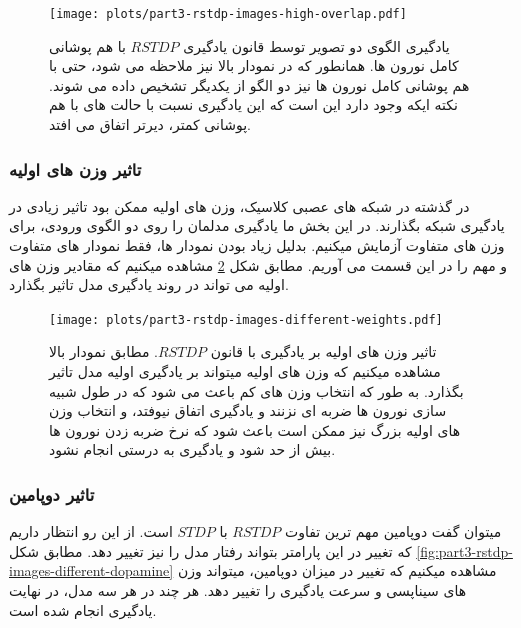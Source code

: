         \begin{figure}[!ht]
            \centering
            \captionsetup{width=.9\linewidth}
            \texttt{[image: plots/part3-rstdp-images-high-overlap.pdf]} 
            \caption{یادگیری الگوی دو تصویر توسط قانون یادگیری 
            $RSTDP$ با هم پوشانی کامل نورون ها.
            همانطور که در نمودار بالا نیز ملاحظه می شود، حتی با هم پوشانی کامل نورون ها نیز دو الگو از یکدیگر تشخیص داده می شوند. نکته ایکه وجود دارد این است که این یادگیری نسبت با حالت های با هم پوشانی کمتر، دیرتر اتفاق می افتد.
            }
            \label{fig:part3-rstdp-images-high-overlap}
        \end{figure}

        
        \clearpage
        \subsubsection*{تاثیر وزن های اولیه}
            در گذشته در شبکه های عصبی کلاسیک، وزن های اولیه ممکن بود تاثیر زیادی در یادگیری شبکه بگذارند. در این بخش ما یادگیری مدلمان را روی دو الگوی ورودی، برای وزن های متفاوت آزمایش میکنیم. بدلیل زیاد بودن نمودار ها، فقط نمودار های متفاوت و مهم را در این قسمت می آوریم.
            مطابق شکل 
            \ref{fig:part3-rstdp-images-different-weights}
            مشاهده میکنیم که مقادیر وزن های اولیه می تواند در روند یادگیری مدل تاثیر بگذارد.
            \begin{figure}[!ht]
                \centering
                \captionsetup{width=.9\linewidth}
                \texttt{[image: plots/part3-rstdp-images-different-weights.pdf]} 
                \caption{تاثیر وزن های اولیه بر یادگیری با قانون 
                $RSTDP$. 
                مطابق نمودار بالا مشاهده میکنیم که وزن های اولیه میتواند بر یادگیری اولیه مدل تاثیر بگذارد. به طور که انتخاب وزن های کم باعث می شود که در طول شبیه سازی نورون ها ضربه ای نزنند و یادگیری اتفاق نیوفتد، و انتخاب وزن های اولیه بزرگ نیز ممکن است باعث شود که نرخ ضربه زدن نورون ها بیش از حد شود و یادگیری به درستی انجام نشود.
                }
                \label{fig:part3-rstdp-images-different-weights}
            \end{figure}

        \newpage
        \subsubsection*{تاثیر دوپامین}
            میتوان گفت دوپامین مهم ترین تفاوت 
            $RSTDP$ 
            با 
            $STDP$ 
            است. از این رو انتظار داریم که تغییر در این پارامتر بتواند رفتار مدل را نیز تغییر دهد.
            مطابق شکل 
            \ref{fig:part3-rstdp-images-different-dopamine}
            مشاهده میکنیم که تغییر در میزان دوپامین، میتواند وزن های سیناپسی و سرعت یادگیری را تغییر دهد. هر چند در هر سه مدل، در نهایت یادگیری انجام شده است.

